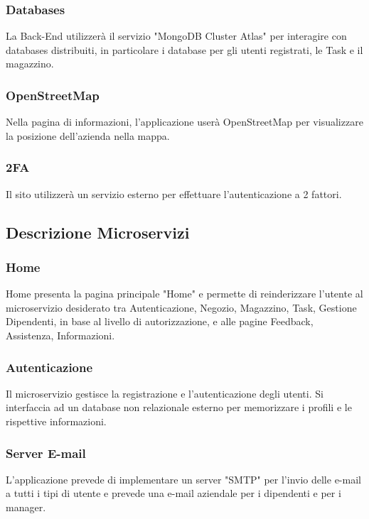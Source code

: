 \documentclass{report}
\begin{document}
\subsubsection{Databases}
La Back-End utilizzerà il servizio "MongoDB Cluster Atlas" per interagire con databases distribuiti, in particolare i database per gli utenti registrati, le Task e il magazzino.

\subsubsection{OpenStreetMap}
Nella pagina di informazioni, l'applicazione userà OpenStreetMap per visualizzare la posizione dell'azienda nella mappa.

\subsubsection{2FA}
Il sito utilizzerà un servizio esterno per effettuare l'autenticazione a 2 fattori.

\subsection{Descrizione Microservizi}

\subsubsection*{Home}
Home presenta la pagina principale "Home" e permette di reinderizzare l'utente al microservizio desiderato tra Autenticazione, Negozio, Magazzino, Task, Gestione Dipendenti, in base al livello di autorizzazione, e alle pagine Feedback, Assistenza, Informazioni.

\subsubsection*{Autenticazione}
Il microservizio gestisce la registrazione e l'autenticazione degli utenti. Si interfaccia ad un database non relazionale esterno per memorizzare i profili e le rispettive informazioni.

\subsubsection*{Server E-mail}
L'applicazione prevede di implementare un server "SMTP" per l’invio delle e-mail a tutti i tipi di utente e prevede una e-mail aziendale per i dipendenti e per i manager.
\end{document}
